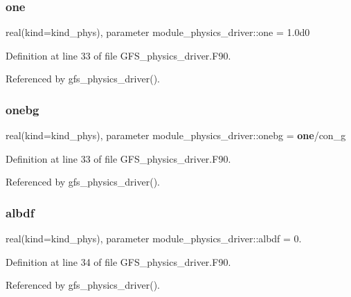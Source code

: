 \subsubsection{one}
{\footnotesize\ttfamily real(kind=kind\+\_\+phys), parameter module\+\_\+physics\+\_\+driver\+::one = 1.\+0d0}



Definition at line 33 of file G\+F\+S\+\_\+physics\+\_\+driver.\+F90.



Referenced by gfs\+\_\+physics\+\_\+driver().

\mbox{\label{namespacemodule__physics__driver_aaaa0568c03e629872f03eae75d3c242b}} 
\subsubsection{onebg}
{\footnotesize\ttfamily real(kind=kind\+\_\+phys), parameter module\+\_\+physics\+\_\+driver\+::onebg = \textbf{ one}/con\+\_\+g}



Definition at line 33 of file G\+F\+S\+\_\+physics\+\_\+driver.\+F90.



Referenced by gfs\+\_\+physics\+\_\+driver().

\mbox{\label{namespacemodule__physics__driver_af95c67209024be3116cbc33bfa7a55fa}} 
\subsubsection{albdf}
{\footnotesize\ttfamily real(kind=kind\+\_\+phys), parameter module\+\_\+physics\+\_\+driver\+::albdf = 0.}



Definition at line 34 of file G\+F\+S\+\_\+physics\+\_\+driver.\+F90.



Referenced by gfs\+\_\+physics\+\_\+driver().

\mbox{\label{namespacemodule__physics__driver_a6593232e4467eec51b6e4acad3dfab8f}} 
